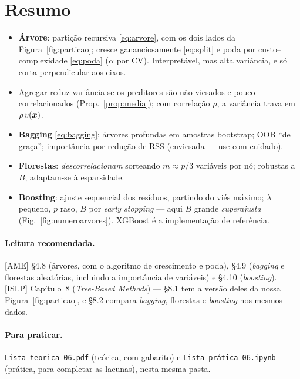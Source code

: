 \documentclass[11pt,a4paper]{article}
\begin{document}
\section*{Resumo}
\begin{itemize}[leftmargin=1.4cm]
  \item \textbf{Árvore}: partição recursiva \eqref{eq:arvore}, com os dois lados da
        Figura~\ref{fig:particao}; cresce gananciosamente \eqref{eq:split} e poda por
        custo--complexidade \eqref{eq:poda} ($\alpha$ por CV). Interpretável, mas
        alta variância, e só corta perpendicular aos eixos.
  \item Agregar reduz variância se os preditores são não-viesados e pouco
        correlacionados (Prop.~\ref{prop:media}); com correlação $\rho$, a variância
        trava em $\rho\,v(\bm{x})$.
  \item \textbf{Bagging} \eqref{eq:bagging}: árvores profundas em amostras
        bootstrap; OOB ``de graça''; importância por redução de RSS (enviesada ---
        use com cuidado).
  \item \textbf{Florestas}: \emph{descorrelacionam} sorteando $m\approx p/3$
        variáveis por nó; robustas a $B$; adaptam-se à esparsidade.
  \item \textbf{Boosting}: ajuste sequencial dos resíduos, partindo do viés máximo;
        $\lambda$ pequeno, $p$ raso, $B$ por \emph{early stopping} --- aqui $B$
        grande \emph{superajusta} (Fig.~\ref{fig:numeroarvores}). XGBoost é a
        implementação de referência.
\end{itemize}

\paragraph{Leitura recomendada.} [AME] §4.8 (árvores, com o algoritmo de
crescimento e poda), §4.9 (\emph{bagging} e florestas aleatórias, incluindo a
importância de variáveis) e §4.10 (\emph{boosting}). [ISLP] Capítulo~8
(\emph{Tree-Based Methods}) --- §8.1 tem a versão deles da nossa
Figura~\ref{fig:particao}, e §8.2 compara \emph{bagging}, florestas e
\emph{boosting} nos mesmos dados.

\paragraph{Para praticar.} \texttt{Lista teorica 06.pdf} (teórica, com gabarito) e \texttt{Lista prática 06.ipynb} (prática, para completar as lacunas), nesta mesma pasta.
\end{document}

